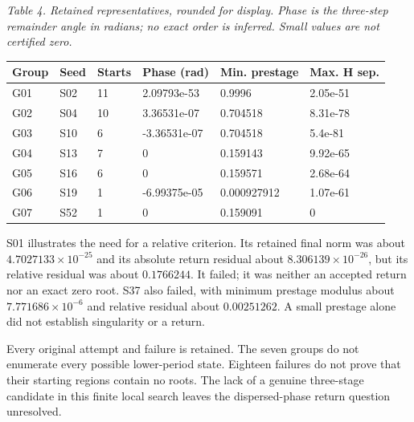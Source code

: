 \documentclass[11pt,a4paper]{article}
\begin{document}
\par\textit{Table 4. Retained representatives, rounded for display. Phase is the three-step remainder angle in radians; no exact order is inferred. Small values are not certified zero.}\par
\begingroup\small
\begin{tabularx}{\textwidth}{XXXXXX}
\toprule
Group & Seed & Starts & Phase (rad) & Min. prestage & Max. H sep.\\\midrule
G01 & S02 & 11 & 2.09793e-53 & 0.9996 & 2.05e-51\\
G02 & S04 & 10 & 3.36531e-07 & 0.704518 & 8.31e-78\\
G03 & S10 & 6 & -3.36531e-07 & 0.704518 & 5.4e-81\\
G04 & S13 & 7 & 0 & 0.159143 & 9.92e-65\\
G05 & S16 & 6 & 0 & 0.159571 & 2.68e-64\\
G06 & S19 & 1 & -6.99375e-05 & 0.000927912 & 1.07e-61\\
G07 & S52 & 1 & 0 & 0.159091 & 0\\
\bottomrule\end{tabularx}\endgroup\par
S01 illustrates the need for a relative criterion. Its retained final norm was about $4.7027133\times10^{-25}$ and its absolute return residual about $8.306139\times10^{-26}$, but its relative residual was about $0.1766244$. It failed; it was neither an accepted return nor an exact zero root. S37 also failed, with minimum prestage modulus about $7.771686\times10^{-6}$ and relative residual about $0.00251262$. A small prestage alone did not establish singularity or a return.

Every original attempt and failure is retained. The seven groups do not enumerate every possible lower-period state. Eighteen failures do not prove that their starting regions contain no roots. The lack of a genuine three-stage candidate in this finite local search leaves the dispersed-phase return question unresolved.

\clearpage
\end{document}
